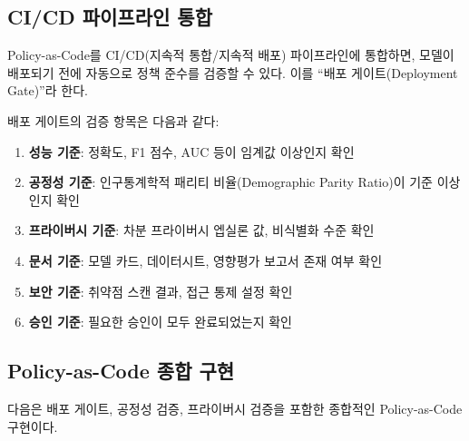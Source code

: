 \subsection{CI/CD 파이프라인 통합}
\label{sec:5.5.2}

Policy-as-Code를 CI/CD(지속적 통합/지속적 배포) 파이프라인에 통합하면, 모델이 배포되기 전에 자동으로 정책 준수를 검증할 수 있다. 이를 ``배포 게이트(Deployment Gate)''라 한다.

배포 게이트의 검증 항목은 다음과 같다:
\begin{enumerate}
 \item \textbf{성능 기준}: 정확도, F1 점수, AUC 등이 임계값 이상인지 확인
 \item \textbf{공정성 기준}: 인구통계학적 패리티 비율(Demographic Parity Ratio)이 기준 이상인지 확인
 \item \textbf{프라이버시 기준}: 차분 프라이버시 엡실론 값, 비식별화 수준 확인
 \item \textbf{문서 기준}: 모델 카드, 데이터시트, 영향평가 보고서 존재 여부 확인
 \item \textbf{보안 기준}: 취약점 스캔 결과, 접근 통제 설정 확인
 \item \textbf{승인 기준}: 필요한 승인이 모두 완료되었는지 확인
\end{enumerate}

\subsection{Policy-as-Code 종합 구현}
\label{sec:5.5.3}

다음은 배포 게이트, 공정성 검증, 프라이버시 검증을 포함한 종합적인 Policy-as-Code 구현이다.

